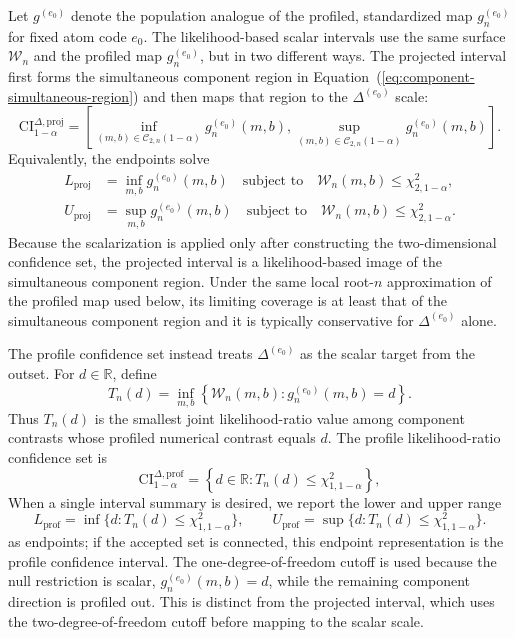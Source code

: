 \documentclass[11pt]{article}
\begin{document}
Let $g^{(e_0)}$ denote the population analogue of the profiled, standardized map $g_n^{(e_0)}$ for fixed atom code $e_0$.
The likelihood-based scalar intervals use the same surface $\mathcal{W}_n$ and the profiled map $g_n^{(e_0)}$, but in two different ways. The projected interval first forms the simultaneous component region in Equation~(\ref{eq:component-simultaneous-region}) and then maps that region to the $\Delta^{(e_0)}$ scale:
\begin{equation}
  \mathrm{CI}^{\Delta,\mathrm{proj}}_{1-\alpha}
  =
  \left[
    \inf_{(m,b)\in\mathcal{C}_{2,n}(1-\alpha)}
    g_n^{(e_0)}(m,b),
    \sup_{(m,b)\in\mathcal{C}_{2,n}(1-\alpha)}
    g_n^{(e_0)}(m,b)
  \right].
  \label{eq:projected-delta-ci}
\end{equation}
Equivalently, the endpoints solve
\begin{align}
  L_{\mathrm{proj}}
  &=
  \inf_{m,b} g_n^{(e_0)}(m,b)
  \quad\text{subject to}\quad
  \mathcal{W}_n(m,b)\leq\chi^2_{2,1-\alpha},
  \label{eq:projected-delta-lower}\\
  U_{\mathrm{proj}}
  &=
  \sup_{m,b} g_n^{(e_0)}(m,b)
  \quad\text{subject to}\quad
  \mathcal{W}_n(m,b)\leq\chi^2_{2,1-\alpha}.
  \label{eq:projected-delta-upper}
\end{align}
Because the scalarization is applied only after constructing the two-dimensional confidence set, the projected interval is a likelihood-based image of the simultaneous component region. Under the same local root-$n$ approximation of the profiled map used below, its limiting coverage is at least that of the simultaneous component region and it is typically conservative for $\Delta^{(e_0)}$ alone.

The profile confidence set instead treats $\Delta^{(e_0)}$ as the scalar target from the outset. For $d\in\mathbb{R}$, define
\begin{equation*}
  T_n(d)
  =
  \inf_{m,b}
  \left\{
    \mathcal{W}_n(m,b):
    g_n^{(e_0)}(m,b)=d
  \right\}.
\end{equation*}
Thus $T_n(d)$ is the smallest joint likelihood-ratio value among component contrasts whose profiled numerical contrast equals $d$. The profile likelihood-ratio confidence set is
\begin{equation}
  \mathrm{CI}^{\Delta,\mathrm{prof}}_{1-\alpha}
  =
  \left\{
    d\in\mathbb{R}:T_n(d)\leq\chi^2_{1,1-\alpha}
  \right\},
  \label{eq:profile-delta-ci}
\end{equation}
When a single interval summary is desired, we report the lower and upper range
\[
  L_{\mathrm{prof}}
  =
  \inf\{d:T_n(d)\leq\chi^2_{1,1-\alpha}\},
  \qquad
  U_{\mathrm{prof}}
  =
  \sup\{d:T_n(d)\leq\chi^2_{1,1-\alpha}\}.
\]
as endpoints; if the accepted set is connected, this endpoint representation is the profile confidence interval.
The one-degree-of-freedom cutoff is used because the null restriction is scalar, $g_n^{(e_0)}(m,b)=d$, while the remaining component direction is profiled out. This is distinct from the projected interval, which uses the two-degree-of-freedom cutoff before mapping to the scalar scale.
\end{document}
